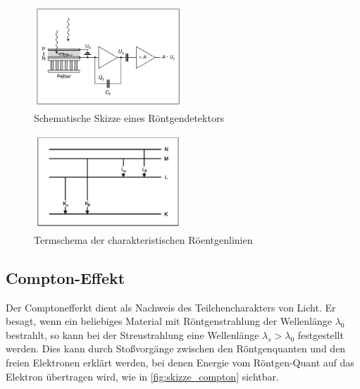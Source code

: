 \documentclass[12pt,english,ngerman]{scrartcl}
\begin{document}
\begin{figure}[H]
	\begin{center}
		\includegraphics[width =0.5\textwidth]{./figures/skizze_roentgendetektor.PNG}
	\end{center}
	\caption[Schematische Skizze eines Röntgendetektors] {Schematische Skizze eines
		Röntgendetektors \cite{unterlagen_rontgenfluorenzenz}
	}\label{fig:skizze_roetgendetektor}
\end{figure}

\begin{figure}[H]
	\begin{center}
		\includegraphics[width =0.5\textwidth]{./figures/termschema_roentgenlinien.PNG}
	\end{center}
	\caption[Termschema der charakteristischen Röentgenlinien] {Termschema der
		charakteristischen Röentgenlinien \cite{unterlagen_rontgenfluorenzenz}
	}\label{fig:termschema_roentgenlinien}
\end{figure}

\subsection{Compton-Effekt}

Der Comptonefferkt dient als Nachweis des Teilchencharakters von Licht. Er
besagt, wenn ein beliebiges Material mit Röntgenstrahlung der Wellenlänge
$\lambda_0$ bestrahlt, so kann bei der Streustrahlung eine Wellenlänge
$\lambda_s > \lambda_0$ festgestellt werden. Dies kann durch Stoßvorgänge
zwischen den Röntgenquanten und den freien Elektronen erklärt werden, bei denen
Energie vom Röntgen-Quant auf das Elektron übertragen wird, wie in
\autoref{fig:skizze_compton} sichtbar.
\end{document}
